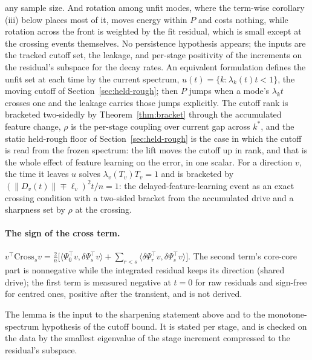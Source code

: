 any sample size. And rotation among unfit modes, where the term-wise
corollary (iii) below places most of it, moves energy within $P$ and costs
nothing, while rotation across the front is weighted by the fit residual,
which is small except at the crossing events themselves. No persistence
hypothesis appears; the inputs are the tracked cutoff set, the leakage, and
per-stage positivity of the increments on the residual's subspace for the
decay rates. An equivalent formulation defines the unfit set at each time by
the current spectrum, $u(t)=\{k:\lambda_k(t)t<1\}$, the moving cutoff of
Section~\ref{sec:held-rough}; then $P$ jumps when a mode's $\lambda_kt$ crosses
one and the leakage carries those jumps explicitly. The cutoff rank is bracketed two-sidedly by
Theorem~\ref{thm:bracket} through the accumulated feature change, $\rho$ is the
per-stage coupling over current gap across $k^*$, and the static held-rough
floor of Section~\ref{sec:held-rough} is the case in which the cutoff is read
from the frozen spectrum: the lift moves the cutoff up in rank, and that is the
whole effect of feature learning on the error, in one scalar. For a direction
$v$, the time it leaves $u$ solves $\lambda_v(T_v)T_v=1$ and is bracketed by
$(\|D_v(t)\|\mp\ell_v)^2t/n=1$: the delayed-feature-learning event as an exact
crossing condition with a two-sided bracket from the accumulated drive and a
sharpness set by $\rho$ at the crossing.

\paragraph{The sign of the cross term.}
\begin{lemma}
\label{lem:sign}
$v^{\!\top}\mathrm{Cross}_sv=\frac2n\big[\langle\Psi_0^{\!\top}v,\delta\Psi_s^{\!\top}v\rangle+\sum_{r<s}\langle\delta\Psi_r^{\!\top}v,\delta\Psi_s^{\!\top}v\rangle\big]$.
The second term's core-core part is nonnegative while the integrated residual
keeps its direction (shared drive); the first term is measured negative at
$t=0$ for raw residuals and sign-free for centred ones, positive after the
transient, and is not derived.
\end{lemma}
The lemma is the input to the sharpening statement above and to the
monotone-spectrum hypothesis of the cutoff bound. It is stated per stage, and
is checked on the data by the smallest eigenvalue of the stage increment
compressed to the residual's subspace.

